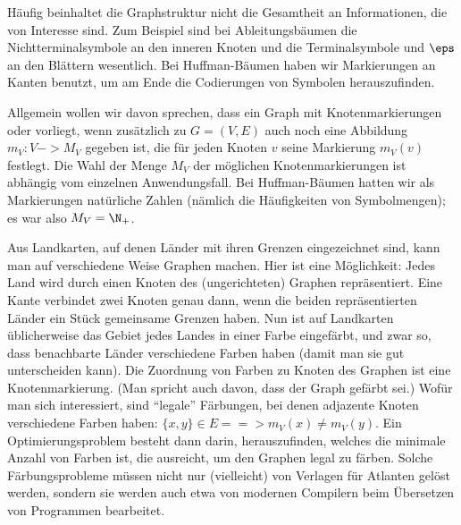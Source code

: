 Häufig beinhaltet die Graphstruktur nicht die Gesamtheit an
Informationen, die von Interesse sind.
% 
Zum Beispiel sind bei Ableitungsbäumen die Nichtterminalsymbole an den
inneren Knoten und die Terminalsymbole und $\eps$ an den Blättern
wesentlich.
% 
Bei Huffman-Bäumen haben wir Markierungen an Kanten benutzt, um am
Ende die Codierungen von Symbolen herauszufinden.

% 
% 

Allgemein wollen wir davon sprechen, dass ein Graph mit
Knotenmarkierungen oder  vorliegt, wenn zusätzlich zu
$G=(V,E)$ auch noch eine Abbildung $m_V:V->M_V$ gegeben ist, die für
jeden Knoten $v$ seine Markierung $m_V(v)$ festlegt.
% 
Die Wahl der Menge $M_V$ der möglichen Knotenmarkierungen ist abhängig
vom einzelnen Anwendungsfall.
% 
Bei Huffman-Bäumen hatten wir als Markierungen natürliche Zahlen
(nämlich die Häufigkeiten von Symbolmengen); es war also $M_V=\N_+$.

Aus Landkarten, auf denen Länder mit ihren Grenzen eingezeichnet sind,
kann man auf verschiedene Weise Graphen machen.
% 
Hier ist eine Möglichkeit: Jedes Land wird durch einen Knoten des
(ungerichteten) Graphen repräsentiert.
% 
Eine Kante verbindet zwei Knoten genau dann, wenn die beiden
repräsentierten Länder ein Stück gemeinsame Grenzen haben.
% 
Nun ist auf Landkarten üblicherweise das Gebiet jedes Landes in einer
Farbe eingefärbt, und zwar so, dass benachbarte Länder verschiedene
Farben haben (damit man sie gut unterscheiden kann).
% 
Die Zuordnung von Farben zu Knoten des Graphen ist eine
Knotenmarkierung.
% 
(Man spricht auch davon, dass der Graph gefärbt sei.) Wofür man sich
interessiert, sind "`legale"' Färbungen, bei denen adjazente Knoten
verschiedene Farben haben: $ \{x,y\}\in E ==> m_V(x)\not= m_V(y)$.
% 
Ein Optimierungsproblem besteht dann \zB darin, herauszufinden,
welches die minimale Anzahl von Farben ist, die ausreicht, um den
Graphen legal zu färben.
% 
Solche Färbungsprobleme müssen nicht nur (vielleicht) von Verlagen für
Atlanten gelöst werden, sondern sie werden auch etwa von modernen
Compilern beim Übersetzen von Programmen bearbeitet.

